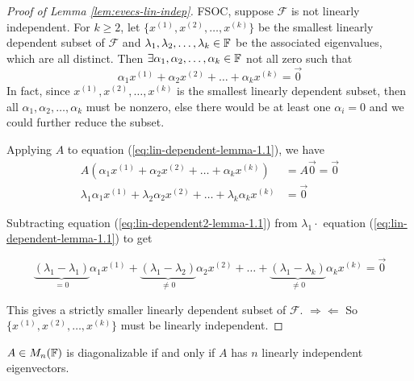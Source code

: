 \begin{proof}[Proof of Lemma \ref{lem:evecs-lin-indep}]
FSOC, suppose $\mathcal{F}$ is not linearly independent. For $k \geq 2$, let $\{x^{(1)}, x^{(2)}, \dots, x^{(k)}\}$ be the smallest linearly dependent subset of $\mathcal{F}$ and $\lambda_1, \lambda_2, \dots, \lambda_k \in \mathbb F$ be the associated eigenvalues, which are all distinct. Then $\exists \alpha_1, \alpha_2, \dots, \alpha_k \in \mathbb F$ not all zero such that
\begin{equation}
\label{eq:lin-dependent-lemma-1.1}
\alpha_1 x^{(1)} + \alpha_2 x^{(2)} + \dots + \alpha_k x^{(k)} = \vec{0}
\end{equation}
In fact, since $x^{(1)}, x^{(2)}, \dots, x^{(k)}$ is the smallest linearly dependent subset, then all $\alpha_1, \alpha_2, \dots, \alpha_k$ must be nonzero, else there would be at least one $\alpha_i = 0$ and we could further reduce the subset.

\noindent Applying $A$ to equation (\ref{eq:lin-dependent-lemma-1.1}), we have
\begin{align}
    A(\alpha_1 x^{(1)} + \alpha_2 x^{(2)} + \dots + \alpha_k x^{(k)}) &= A\vec{0} = \vec{0} \nonumber \\
    \lambda_1\alpha_1 x^{(1)} + \lambda_2\alpha_2 x^{(2)} + \dots + \lambda_k\alpha_k x^{(k)} &= \vec{0} \label{eq:lin-dependent2-lemma-1.1}
\end{align}

\noindent Subtracting equation (\ref{eq:lin-dependent2-lemma-1.1}) from $\lambda_1 \cdot$ equation (\ref{eq:lin-dependent-lemma-1.1}) to get

$$
\underbrace{(\lambda_1 - \lambda_1)}_{=0} \alpha_1 x^{(1)} + 
\underbrace{(\lambda_1 - \lambda_2)}_{\not=0} \alpha_2 x^{(2)} + \dots + 
\underbrace{(\lambda_1 - \lambda_k)}_{\not=0} \alpha_k x^{(k)} = \vec{0}
$$

\noindent This gives a strictly smaller linearly dependent subset of $\mathcal{F}$. $\Rightarrow\Leftarrow$ So $\{x^{(1)}, x^{(2)}, \dots, x^{(k)}\}$ must be linearly independent.
\end{proof}

\begin{theorem}
\label{thm:diagonalizable-lin-ind-evecs}
$A \in M_n(\mathbb F)$ is diagonalizable if and only if $A$ has $n$ linearly independent eigenvectors.
\end{theorem}

